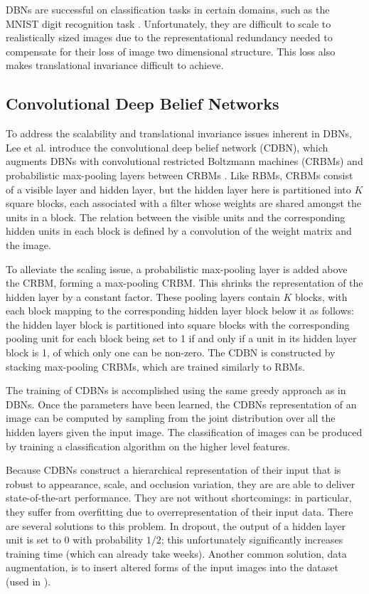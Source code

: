 \documentclass[10pt,twocolumn,letterpaper]{article}
\begin{document}
DBNs are successful on classification tasks in certain domains, such as the MNIST digit recognition
task \cite{HintonDBN}. Unfortunately, they are difficult to scale to realistically sized images
due to the representational redundancy needed to compensate for their loss of image
two dimensional structure. This loss also makes translational invariance difficult to achieve.

\subsection{Convolutional Deep Belief Networks}

To address the scalability and translational invariance issues inherent in DBNs,
Lee et al. introduce the convolutional deep belief network (CDBN),
which augments DBNs with convolutional restricted Boltzmann machines (CRBMs)
and probabilistic max-pooling layers between CRBMs \cite{CDBN}.
Like RBMs, CRBMs consist of a visible layer and hidden layer, but the hidden
layer here is partitioned into \(K \) square blocks, each associated with a filter
whose weights are shared amongst the units in a block.
The relation between the visible units and the corresponding hidden units in each
block is defined by a convolution of the weight matrix and the image.

To alleviate the scaling issue, a probabilistic max-pooling layer is added above the CRBM,
forming a max-pooling CRBM.
This shrinks the representation of the hidden layer by a constant factor.
These pooling layers contain \(K \) blocks, with each block mapping to the corresponding hidden
layer block below it as follows: the hidden layer block is partitioned into square blocks with the
corresponding pooling unit for each block being set to 1 if and only if a unit in its hidden layer
block is 1, of which only one can be non-zero.
The CDBN is constructed by stacking max-pooling CRBMs,
which are trained similarly to RBMs.

The training of CDBNs is accomplished using the same greedy approach as in DBNs.
Once the parameters have been learned, the CDBNs representation of an image can be computed
by sampling from the joint distribution over all the hidden layers given the input image.
The classification of images can be produced by training a classification algorithm
on the higher level features.

Because CDBNs construct a hierarchical representation of their input that is robust
to appearance, scale, and occlusion variation, they are are able to deliver
state-of-the-art performance.
They are not without shortcomings: in particular, they suffer from overfitting due
to overrepresentation of their input data.
There are several solutions to this problem. In dropout, the output of a hidden layer
unit is set to 0 with probability \(1/2 \); this unfortunately significantly increases training
time (which can already take weeks). Another common solution, data augmentation,
is to insert altered forms of the input images into the dataset (used in \cite{Verydeep}).
\end{document}
